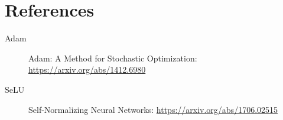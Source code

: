 \chapter{References}

\begin{description}
	\item[Adam] Adam: A Method for Stochastic Optimization: \url{https://arxiv.org/abs/1412.6980} \label{adam}
	\item[SeLU] Self-Normalizing Neural Networks: \url{https://arxiv.org/abs/1706.02515} \label{selu}
\end{description}



